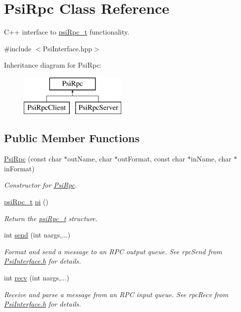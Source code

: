 \hypertarget{classPsiRpc}{}\section{Psi\+Rpc Class Reference}
\label{classPsiRpc}


C++ interface to \hyperlink{structpsiRpc__t}{psi\+Rpc\+\_\+t} functionality.  




{\ttfamily \#include $<$Psi\+Interface.\+hpp$>$}

Inheritance diagram for Psi\+Rpc\+:\begin{figure}[H]
\begin{center}
\leavevmode
\includegraphics[height=2.000000cm]{classPsiRpc}
\end{center}
\end{figure}
\subsection*{Public Member Functions}
\begin{DoxyCompactItemize}
\item 
\hyperlink{classPsiRpc_a59e6a3c10d5d3b8b5ddbad8272c21609}{Psi\+Rpc} (const char $\ast$out\+Name, char $\ast$out\+Format, const char $\ast$in\+Name, char $\ast$in\+Format)
\begin{DoxyCompactList}\small\item\em Constructor for \hyperlink{classPsiRpc}{Psi\+Rpc}. \end{DoxyCompactList}\item 
\hyperlink{structpsiRpc__t}{psi\+Rpc\+\_\+t} \hyperlink{classPsiRpc_a2dea366d618c566f39549593808a91ab}{pi} ()
\begin{DoxyCompactList}\small\item\em Return the \hyperlink{structpsiRpc__t}{psi\+Rpc\+\_\+t} structure. \end{DoxyCompactList}\item 
int \hyperlink{classPsiRpc_a9a24ea2c10ec433ce2571714659e8156}{send} (int nargs,...)
\begin{DoxyCompactList}\small\item\em Format and send a message to an R\+PC output queue. See rpc\+Send from \hyperlink{PsiInterface_8h_source}{Psi\+Interface.\+h} for details. \end{DoxyCompactList}\item 
int \hyperlink{classPsiRpc_a4f66919b86a358644d73c686b9a6b409}{recv} (int nargs,...)
\begin{DoxyCompactList}\small\item\em Receive and parse a message from an R\+PC input queue. See rpc\+Recv from \hyperlink{PsiInterface_8h_source}{Psi\+Interface.\+h} for details. \end{DoxyCompactList}\end{DoxyCompactItemize}


